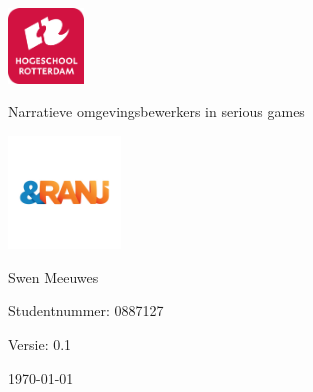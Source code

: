 \documentclass{report}
\newcommand{\versionnumber}{0.1}
\newcommand{\name}{Swen Meeuwes}
\newcommand{\studentnumber}{0887127}
\renewcommand{\title}{Narratieve omgevingsbewerkers in serious games}
\newcommand{\subtitle}{}
\begin{document}
\begin{titlepage}
        \centering
        \includegraphics[width=2cm]{University}\par
        \vspace{4\baselineskip}
        {\Huge\title\par}
        {\Large\subtitle\par}
        \par
        \includegraphics[width=3cm]{Organisation}
        \vspace{4\baselineskip}
        \par
        {\Large\name\par}
        {Studentnummer: \studentnumber\par}
        \vfill
        {\hfill Versie: \versionnumber\par}
        {\hfill \today}
\end{titlepage}



\tableofcontents














\end{document}
